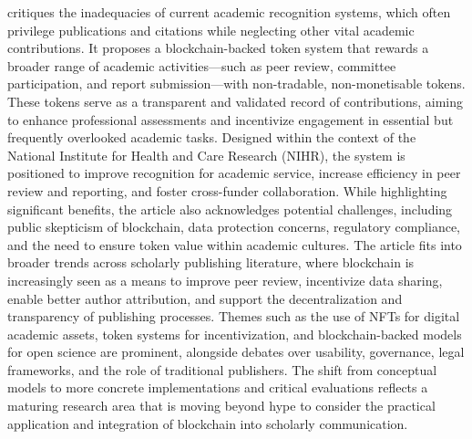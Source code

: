 \documentclass{article}
\begin{document}
\cite{lee_unblocking_2023} critiques the inadequacies of current academic recognition systems, which often privilege publications and citations while neglecting other vital academic contributions. It proposes a blockchain-backed token system that rewards a broader range of academic activities—such as peer review, committee participation, and report submission—with non-tradable, non-monetisable tokens. These tokens serve as a transparent and validated record of contributions, aiming to enhance professional assessments and incentivize engagement in essential but frequently overlooked academic tasks. Designed within the context of the National Institute for Health and Care Research (NIHR), the system is positioned to improve recognition for academic service, increase efficiency in peer review and reporting, and foster cross-funder collaboration. While highlighting significant benefits, the article also acknowledges potential challenges, including public skepticism of blockchain, data protection concerns, regulatory compliance, and the need to ensure token value within academic cultures. The article fits into broader trends across scholarly publishing literature, where blockchain is increasingly seen as a means to improve peer review, incentivize data sharing, enable better author attribution, and support the decentralization and transparency of publishing processes. Themes such as the use of NFTs for digital academic assets, token systems for incentivization, and blockchain-backed models for open science are prominent, alongside debates over usability, governance, legal frameworks, and the role of traditional publishers. The shift from conceptual models to more concrete implementations and critical evaluations reflects a maturing research area that is moving beyond hype to consider the practical application and integration of blockchain into scholarly communication.

\end{document}
